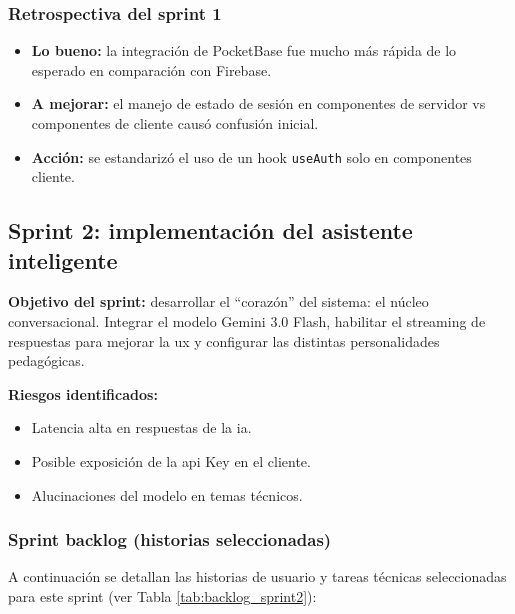 \subsubsection{Retrospectiva del sprint 1}
\begin{itemize}
\item \textbf{Lo bueno:} la integración de PocketBase fue mucho más rápida de lo esperado en comparación con Firebase.
\item \textbf{A mejorar:} el manejo de estado de sesión en componentes de servidor vs componentes de cliente causó confusión inicial.
\item \textbf{Acción:} se estandarizó el uso de un hook \texttt{useAuth} solo en componentes cliente.
\end{itemize}

\subsection{Sprint 2: implementación del asistente inteligente}

\textbf{Objetivo del sprint:} desarrollar el \enquote{corazón} del sistema: el núcleo conversacional. Integrar el modelo Gemini 3.0 Flash, habilitar el streaming de respuestas para mejorar la \gls{ux} y configurar las distintas personalidades pedagógicas.

\textbf{Riesgos identificados:}
\begin{itemize}
\item Latencia alta en respuestas de la \gls{ia}.
\item Posible exposición de la \gls{api} Key en el cliente.
\item Alucinaciones del modelo en temas técnicos.
\end{itemize}

\subsubsection{Sprint backlog (historias seleccionadas)}

A continuación se detallan las historias de usuario y tareas técnicas seleccionadas para este sprint (ver Tabla \ref{tab:backlog_sprint2}):

